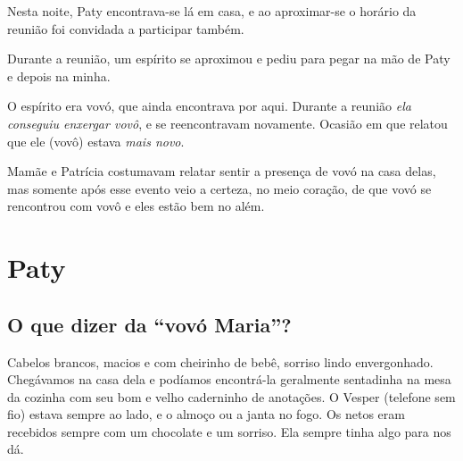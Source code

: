 \documentclass[
  brazil,
  a6paper,
  oneside,
  landscape,
  14pt]{scrbook}
\begin{document}
Nesta noite, Paty encontrava-se lá em casa, e ao aproximar-se o horário
da reunião foi convidada a participar também.

Durante a reunião, um espírito se aproximou e pediu para pegar na mão de
Paty e depois na minha.

O espírito era vovó, que ainda encontrava por aqui. Durante a reunião
\emph{ela conseguiu enxergar vovô}, e se reencontravam novamente.
Ocasião em que relatou que ele (vovô) estava \emph{mais novo}.

Mamãe e Patrícia costumavam relatar sentir a presença de vovó na casa
delas, mas somente após esse evento veio a certeza, no meio coração, de
que vovó se rencontrou com vovô e eles estão bem no além.

\hypertarget{paty}{%
\section{Paty}\label{paty}}

\hypertarget{o-que-dizer-da-vovuxf3-maria}{%
\subsection{O que dizer da ``vovó
Maria''?}\label{o-que-dizer-da-vovuxf3-maria}}

Cabelos brancos, macios e com cheirinho de bebê, sorriso lindo
envergonhado. Chegávamos na casa dela e podíamos encontrá-la geralmente
sentadinha na mesa da cozinha com seu bom e velho caderninho de
anotações. O Vesper (telefone sem fio) estava sempre ao lado, e o almoço
ou a janta no fogo. Os netos eram recebidos sempre com um chocolate e um
sorriso. Ela sempre tinha algo para nos dá.
\end{document}
